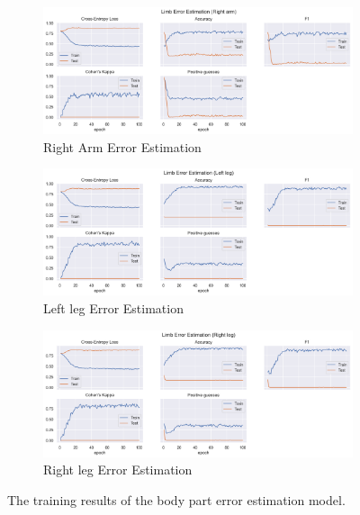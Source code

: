 \begin{figure}
  \begin{subfigure}[b]{0.9\linewidth}
      \centering
      \includegraphics[width=\textwidth]{figures/Results/lb/LimbErrorEstimation_Right arm.png}
      \caption{Right Arm Error Estimation}
      \label{fig:riar_lb_ee}
  \end{subfigure}
  \hfill
  \begin{subfigure}[b]{0.9\linewidth}
      \centering
      \includegraphics[width=\textwidth]{figures/Results/lb/LimbErrorEstimation_Left leg.png}
      \caption{Left leg Error Estimation}
      \label{fig:lele_lb_ee}
  \end{subfigure}
  \hfill
  \begin{subfigure}[b]{0.9\linewidth}
      \centering
      \includegraphics[width=\textwidth]{figures/Results/lb/LimbErrorEstimation_Right leg.png}
      \caption{Right leg Error Estimation}
      \label{fig:rileg_lb_ee}
  \end{subfigure}
  \hfill
  \caption[Limb model training results]{The training results of the body part error estimation model.}
     \label{fig:body part_training_results}
\end{figure}


